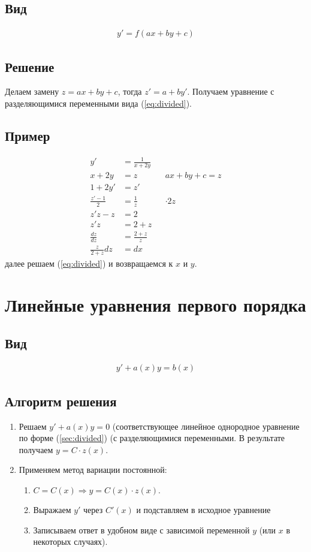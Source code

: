 \documentclass[fontsize=10pt,a4paper,fleqn]{scrreprt} %
\numberwithin{equation}{section}
\begin{document}
\subsection{Вид}
\begin{align}
  y' = f(ax+by+c)
\end{align}

\subsection{Решение}
Делаем замену $z = ax + by + c$, тогда $z' = a + by'$. Получаем уравнение
с разделяющимися переменными вида (\ref{eq:divided}).

\subsection{Пример}
\begin{align*}
  y' &= \frac1{x+2y} \\
  x+2y &= z && ax + by +c = z \\
  1 + 2y' &= z' \\
  \frac{z'-1}2 &= \frac1z && \cdot 2z \\
  z'z - z  &= 2 \\
  z'z &= 2+z\\
  \frac{dz}{dz}  &= \frac{2+z}z\\
  \frac{z}{2+z}dz &= dx
\end{align*}
далее решаем (\ref{eq:divided}) и возвращаемся к $x$ и $y$.

\section{Линейные уравнения первого порядка}
\label{sec:lineardiff}

\subsection{Вид}
\begin{align}
  \label{eq:lineardiff}
  \boxed{y' + a(x) y = b(x)}
\end{align}

\subsection{Алгоритм решения}
\begin{enumerate}
\item Решаем $y' + a(x)y = 0$ (соответствующее линейное однородное уравнение по форме (\ref{sec:divided}) (с разделяющимися переменными. В результате получаем $y = C\cdot z (x)$.
\item Применяем метод вариации постоянной:
  \begin{enumerate}
  \item $C = C(x) \Rightarrow y = C(x)\cdot z(x).$
  \item Выражаем $y'$ через $C'(x)$ и подставляем в исходное уравнение
  \item Записываем ответ в удобном виде с зависимой переменной $y$ (или $x$ в некоторых случаях).
  \end{enumerate}
\end{enumerate}
\end{document}
